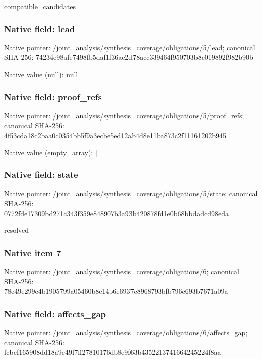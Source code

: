 \documentclass[10pt,a4paper]{article}
\begin{document}
\begingroup\raggedright\sloppy compatible\_\allowbreak{}candidates\par\endgroup

\subsubsection{Native field: lead}
Native pointer: /joint\_\allowbreak{}analysis/synthesis\_\allowbreak{}coverage/obligations/5/lead; canonical SHA-256: 74234e98afe7498fb5daf1f36ac2d78acc339464f950703b8c019892f982b90b

Native value (null): null

\subsubsection{Native field: proof\_\allowbreak{}refs}
Native pointer: /joint\_\allowbreak{}analysis/synthesis\_\allowbreak{}coverage/obligations/5/proof\_\allowbreak{}refs; canonical SHA-256: 4f53cda18c2baa0c0354bb5f9a3ecbe5ed12ab4d8e11ba873c2f11161202b945

Native value (empty\_\allowbreak{}array): []

\subsubsection{Native field: state}
Native pointer: /joint\_\allowbreak{}analysis/synthesis\_\allowbreak{}coverage/obligations/5/state; canonical SHA-256: 0772fde17309bd271c343f359e848907b3a93b420878fd1e0b68bbdadcd98eda

\begingroup\raggedright\sloppy resolved\par\endgroup

\subsubsection{Native item 7}
Native pointer: /joint\_\allowbreak{}analysis/synthesis\_\allowbreak{}coverage/obligations/6; canonical SHA-256: 78c49e299c4b1905799a05460b8c14b6e6937c8968793bfb796c693b7671a09a

\subsubsection{Native field: affects\_\allowbreak{}gap}
Native pointer: /joint\_\allowbreak{}analysis/synthesis\_\allowbreak{}coverage/obligations/6/affects\_\allowbreak{}gap; canonical SHA-256: fcbcf165908dd18a9e49f7ff27810176db8e9f63b4352213741664245224f8aa
\end{document}
